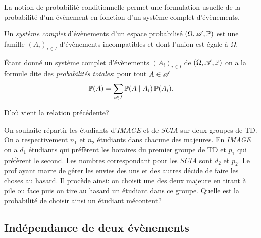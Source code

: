 \documentclass[11pt, a4paper]{article}
\begin{document}
La notion de probabilité conditionnelle permet une formulation usuelle
de la probabilité d'un évènement en fonction d'un système complet
d'évènements.
\begin{defn}
  Un \emph{système complet} d'évènements d'un espace probabilisé
  $(\Omega, \mathscr{A}, \operatorname{\mathbb{P}})$ est une famille $(A_i)_{i \in I}$
  d'évènements incompatibles et dont l'union est égale à
  $\Omega$.
\end{defn}
\begin{prop}
  Étant donné un système complet d'évènements $(A_i)_{i \in I}$ de
  $(\Omega, \mathscr{A}, \operatorname{\mathbb{P}})$ on a la formule dite des \emph{probabilités
    totales}: pour tout $A \in \mathscr{A}$
  \[
    \operatorname{\mathbb{P}}(A) = \sum_{i \in I} \operatorname{\mathbb{P}}(A \mid A_i)\operatorname{\mathbb{P}}(A_i).
  \]
\end{prop}
\begin{question}
  D'où vient la relation précédente?
\end{question}
\begin{question}
  On souhaite répartir les étudiants d'\textit{IMAGE} et de
  \textit{SCIA} sur deux groupes de TD. On a respectivement $n_1$ et
  $n_2$ étudiants dans chacune des majeures. En \textit{IMAGE} on a
  $d_1$ étudiants qui préfèrent les horaires du premier groupe de TD
  et $p_1$ qui préfèrent le second. Les nombres correspondant pour les
  \textit{SCIA} sont $d_2$ et $p_2$. Le prof ayant marre de gérer les
  envies des uns et des autres décide de faire les choses au
  hasard. Il procède ainsi: on choisit une des deux majeure en tirant
  à pile ou face puis on tire au hasard un étudiant dans ce
  groupe. Quelle est la probabilité de choisir ainsi un étudiant
  mécontent?
\end{question}

\subsection{Indépendance de deux évènements}
\label{sec:independance}
\end{document}
